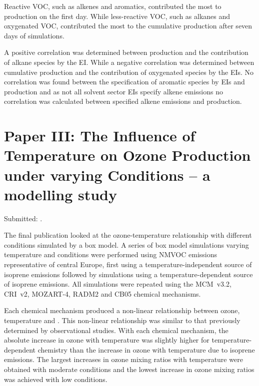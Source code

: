 Reactive VOC, such as alkenes and aromatics, contributed the most to  production on the first day.
While less-reactive VOC, such as alkanes and oxygenated VOC, contributed the most to the cumulative  production after seven days of simulations. 

A positive correlation was determined between  production and the contribution of alkane species by the EI.
While a negative correlation was determined between cumulative  production and the contribution of oxygenated species by the EIs.
No correlation was found between the specification of aromatic species by EIs and  production and as not all solvent sector EIs specify alkene emissions no correlation was calculated between specified alkene emissions and  production.

\singlespacing
\section{Paper III: The Influence of Temperature on Ozone Production under varying  Conditions -- a modelling study} \label{s:T-O3_results}

\onehalfspacing

\noindent
Submitted: .

The final publication looked at the ozone-temperature relationship with different  conditions simulated by a box model.
A series of box model simulations varying temperature and  conditions were performed using NMVOC emissions representative of central Europe, first using a temperature-independent source of isoprene emissions followed by simulations using a temperature-dependent source of isoprene emissions.
All simulations were repeated using the MCM~v3.2, CRI~v2, MOZART-4, RADM2 and CB05 chemical mechanisms.

Each chemical mechanism produced a non-linear relationship between ozone, temperature and .
This non-linear relationship was similar to that previously determined by observational studies.  
With each chemical mechanism, the absolute increase in ozone with temperature was slightly higher for temperature-dependent chemistry than the increase in ozone with temperature due to isoprene emissions.
The largest increases in ozone mixing ratios with temperature were obtained with moderate  conditions and the lowest increase in ozone mixing ratios was achieved with low  conditions.

